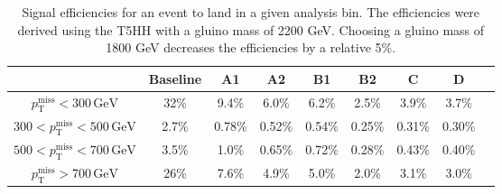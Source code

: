 \begin{table}[hbp!]
\centering
\caption[T5HH signal event efficiencies.]{
Signal efficiencies for an event to land in a given analysis bin.
The efficiencies were derived using the T5HH  with a gluino mass of 2200 GeV.
Choosing a gluino mass of 1800 GeV decreases the efficiencies by a relative 5\%.
}
\begin{tabular}{c | c c c c c c c c}
\hline
\hline
                                                            & Baseline & A1     & A2      & B1      & B2      & C       & D\\
\hline
$p_{\mathrm{T}}^{\mathrm{miss}}< 300\,\mathrm{GeV}$        & 32\%    & 9.4\%   & 6.0\%   & 6.2\%   & 2.5\%   & 3.9\%   & 3.7\% \\
$300 < p_{\mathrm{T}}^{\mathrm{miss}} < 500\,\mathrm{GeV}$  & 2.7\%   & 0.78\%  & 0.52\%  & 0.54\%  & 0.25\%  & 0.31\%  & 0.30\% \\
$500 < p_{\mathrm{T}}^{\mathrm{miss}} < 700\,\mathrm{GeV}$  & 3.5\%   & 1.0\%   & 0.65\%  & 0.72\%  & 0.28\%  & 0.43\%  & 0.40\% \\
$p_{\mathrm{T}}^{\mathrm{miss}} > 700\,\mathrm{GeV}$        & 26\%    & 7.6\%   & 4.9\%   & 5.0\%   & 2.0\%   & 3.1\%   & 3.0\% \\
\hline
\hline
\end{tabular}
\label{tab:sigeff}
\end{table}
